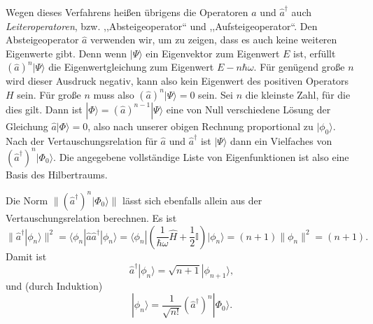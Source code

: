 Wegen dieses Verfahrens heißen übrigens die Operatoren $\widehat{a}$ und $\widehat{a}^\dag$ auch \emph{Leiteroperatoren}, bzw. ,,Absteigeoperator`` und ,,Aufsteigeoperator``. Den Absteigeoperator $\widehat{a}$ verwenden wir, um zu zeigen, dass es auch keine weiteren Eigenwerte gibt. Denn wenn $|\Psi\rangle$ ein Eigenvektor zum Eigenwert $E$ ist, erfüllt $(\widehat{a})^n|\Psi\rangle$ die Eigenwertgleichung zum Eigenwert $E − n\hbar \omega$. Für genügend große $n$ wird dieser Ausdruck negativ, kann also kein Eigenwert des positiven Operators
$H$ sein. Für große $n$ muss also $(\widehat{a})^n|\Psi\rangle=0$ sein. Sei $n$ die kleinste Zahl, für die dies gilt. Dann ist $|\Phi\rangle = (\widehat{a})^{n-1}|\Psi\rangle$ eine von Null verschiedene Lösung
der Gleichung $\widehat{a}|\Phi\rangle = 0$, also nach unserer obigen Rechnung proportional zu $|\phi_0\rangle$. Nach der Vertauschungsrelation für $\widehat{a}$ und $\widehat{a}^\dag$ ist $|\Psi\rangle$ dann ein Vielfaches von
$(\widehat{a}^\dag)^n|\Phi_0\rangle$. Die angegebene vollständige Liste von Eigenfunktionen ist also eine Basis des Hilbertraums.

Die Norm $\|(\widehat{a}^\dag)^n|\Phi_0\rangle\|$ lässt sich ebenfalls allein aus der Vertauschungsrelation
berechnen. Es ist
\begin{equation}
	\|\widehat{a}^\dag|\phi_n\rangle\|^2 = \langle\phi_n|\widehat{a}\widehat{a}^\dag|\phi_n\rangle =  \langle\phi_n|\left(\frac{1}{\hbar\omega}\widehat{H}+\frac12\mathbb{I}\right)|\phi_n\rangle=(n+1)\|\phi_n\|^2 = (n+1).
\end{equation}
Damit ist 
\begin{equation}
	\widehat{a}^\dag|\phi_n\rangle = \sqrt{n+1}|\phi_{n+1}\rangle,
\end{equation}
und (durch Induktion)
\begin{equation}
	|\phi_n\rangle = \frac{1}{\sqrt{n!}}(\widehat{a}^\dag)^n|\Phi_0\rangle.
\end{equation}

